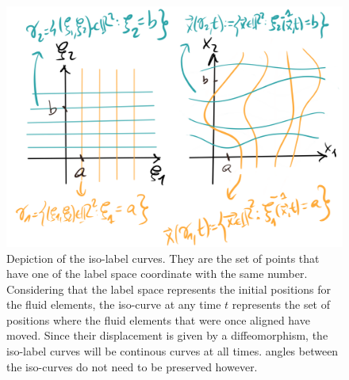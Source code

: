 \documentclass[11pt, a4paper]{article} %
\begin{document}
\begin{figure}[h!]
  \centering
    \includegraphics[width=0.65\linewidth]{5isolines.png}
  \caption{Depiction of the iso-label curves. They are the set of points that have one of the label space coordinate with the same number. Considering that the label space represents the initial positions for the fluid elements, the iso-curve at any time $t$ represents the set of positions where the fluid elements that were once aligned have moved. Since their displacement is given by a diffeomorphism, the iso-label curves will be continous curves at all times. angles between the iso-curves do not need to be preserved however. }
  \label{fig:isoline}
\end{figure}
\end{document}
